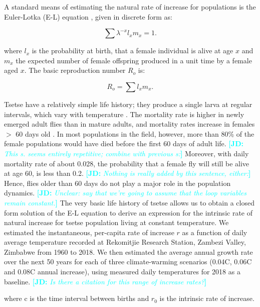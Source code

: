 \documentclass[12pt,a4paper]{article}
\newcommand{\comment}[3]{\textcolor{#1}{\textbf{[#2: }\textsl{#3}\textbf{]}}}
\newcommand{\jd}[1]{\comment{cyan}{JD}{#1}}
\begin{document}
A standard means of estimating the natural rate of increase for populations is the Euler-Lotka (E-L) equation \cite{Birch1948,Zidon2015}, given in discrete form as:

\begin{equation}
\label{equation3}
\sum \lambda^{-x}l_{x}m_{x} = 1.
\end{equation}

where  $l_{x}$ is the probability at birth, that a female individual is alive at age $x$ and $m_{x}$ the expected number of female offspring produced in a unit time by a female aged $x$.
The basic reproduction number $R_{o}$ is:

\begin{equation}
\label{equation4}
R_{o}= \sum l_{x}m_{x}. 
\end{equation}

Tsetse have a relatively simple life history; they produce a single larva at regular intervals, which vary with temperature \cite{hargrove2003tsetse}. The mortality rate is higher in newly emerged adult flies than in mature adults, and mortality rates increase in females $>$ 60 days old \cite{hargrove2020model}. In most populations in the field, however, more than 80\% of the female populations would have died before the first 60 days of adult life. \jd{This s. seems entirely repetitive; combine with previous s:} Moreover, with daily mortality rate of about 0.028, the probability that a female fly will still be alive at age 60, is less than 0.2.  \jd{Nothing is really added by this sentence, either:} Hence, flies older than 60 days do not play a major role in the population dynamics.  \jd{Unclear: say that we're going to assume that the loop variables remain constant.} The very basic life history of tsetse allows us to obtain a closed form solution of the E-L equation to derive an expression for the intrinsic rate of natural increase for tsetse population living at constant temperature. We estimated the instantaneous, per-capita rate of increase $r$ as a function of daily average temperature recorded at Rekomitjie Research Station, Zambezi Valley, Zimbabwe from 1960 to 2018. We then estimated the average annual growth rate over the next 50 years for each of three climate-warming scenarios (0.04\textdegree C, 0.06\textdegree C and 0.08\textdegree C annual increase), using measured daily temperatures for 2018 as a baseline. 
\jd{Is there a citation for this range of increase rates?}

where c is the time interval between births and $r_0$ is the intrinsic rate of increase.
	
\end{document}
